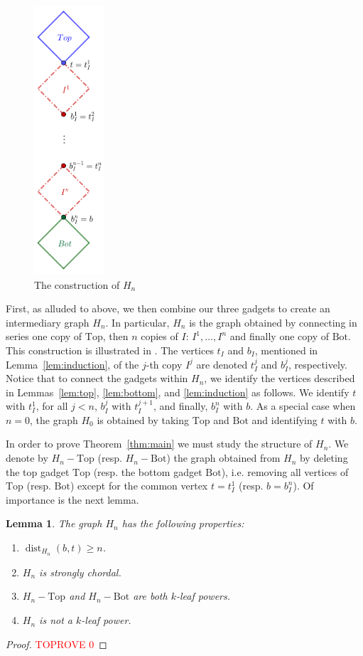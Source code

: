 \documentclass[11pt,letter]{article}
\newtheorem{lemma}[theorem]{Lemma}
\theoremstyle{remark}
\newcommand{\T}{\text{Top}}
\newcommand{\B}{\text{Bot}}
\DeclareMathOperator{\dist}{dist}
\begin{document}
\begin{figure}[h!]
    \centering
    \includegraphics[height=10cm]{ConstructionHn.png}
    \caption{The construction of $H_n$}\label{fig:Hn}
\end{figure}

First, as alluded to above, we then combine our three gadgets to create an intermediary graph $H_n$. In particular, $H_n$ is the graph obtained by connecting in series one copy of $\T$,
then $n$ copies of $I$: $I^1, \dots, I^n$ and finally one copy of $\B$.  
This construction is illustrated in .
The vertices $t_I$ and $b_I$, mentioned in Lemma~\ref{lem:induction}, of the $j$-th copy $I^j$ are denoted $t^j_I$ and $b^j_I$, respectively.
Notice that to connect the gadgets within $H_n$, we identify the vertices described in Lemmas~\ref{lem:top}, \ref{lem:bottom}, and \ref{lem:induction} as follows. We identify $t$ with $t^1_I$, for all $j < n$, $b^j_I$ with $t^{j+1}_I$, and finally, $b^n_I$ with $b$. As a special case when $n = 0$, the graph $H_0$ is obtained by taking $\T$ and $\B$ and identifying $t$ with $b$.

In order to prove Theorem~\ref{thm:main} we must study the structure of $H_n$. We denote by $H_n - \T$ (resp. $H_n - \B$) the graph obtained from $H_n$ by deleting the top gadget $\T$ (resp. the bottom gadget $\B$), i.e. removing all vertices of $\T$ (resp. $\B$) except for the common vertex $t = t_I^1$ (resp. $b = b_I^n$). Of importance is the next lemma.
\begin{lemma}\label{lem:Hn}
    The graph $H_n$ has the following properties:
    \begin{enumerate}
        \item $\dist_{H_n}(b,t) \geq n$. \label{cond:increasing}
        \item $H_n$ is strongly chordal. \label{cond:Str-Chordal}
        \item $H_n - \T$ and $H_n - \B$ are both $k$-leaf powers. \label{cond:Top/Bot}
        \item $H_n$ is not a $k$-leaf power. \label{cond:not-LP}
        \end{enumerate}
\end{lemma}
\begin{proof}\textcolor{red}{TOPROVE 0}\end{proof}
\end{document}
